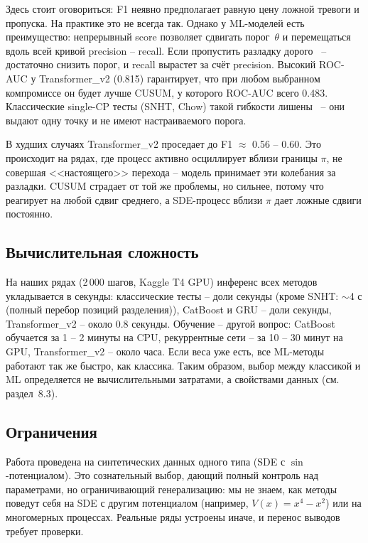 \documentclass[12pt,a4paper]{article}
\begin{document}
Здесь стоит оговориться: F1 неявно предполагает равную цену 
ложной тревоги и пропуска. На практике это не всегда так. 
Однако у ML-моделей есть преимущество: непрерывный score 
позволяет сдвигать порог~$\theta$ и перемещаться вдоль всей 
кривой precision -- recall. Если пропустить разладку дорого~ -- 
достаточно снизить порог, и recall вырастет за счёт precision. 
Высокий ROC-AUC у Transformer\_v2 (0.815) гарантирует, что 
при любом выбранном компромиссе он будет лучше CUSUM, у 
которого ROC-AUC всего 0.483. Классические single-CP тесты 
(SNHT, Chow) такой гибкости лишены~ -- они выдают одну точку 
и не имеют настраиваемого порога.

В худших случаях Transformer\_v2 проседает до F1 $\approx$ 0.56 -- 0.60. Это происходит на рядах, где процесс активно осциллирует вблизи границы $\pi$, не совершая <<настоящего>> перехода  -- модель принимает эти колебания за разладки. CUSUM страдает от той же проблемы, но сильнее, потому что реагирует на любой сдвиг среднего, а SDE-процесс вблизи $\pi$ дает ложные сдвиги постоянно.

\subsection{Вычислительная сложность}

На наших рядах (2\,000 шагов, Kaggle T4 GPU) инференс всех методов укладывается в секунды: классические тесты  -- доли секунды (кроме SNHT: $\sim$4 с (полный перебор позиций разделения)), CatBoost и GRU  -- доли секунды, Transformer\_v2  -- около 0.8 секунды. Обучение  -- другой вопрос: CatBoost обучается за 1 -- 2 минуты на CPU, рекуррентные сети  -- за 10 -- 30 минут на GPU, Transformer\_v2  -- около часа. Если веса уже есть, все ML-методы работают так же быстро, как классика. Таким образом, выбор между классикой и ML определяется не вычислительными затратами, а свойствами данных (см. раздел~8.3).

\subsection{Ограничения}

Работа проведена на синтетических данных одного типа (SDE с $\sin$-потенциалом). Это сознательный выбор, дающий полный контроль над параметрами, но ограничивающий генерализацию: мы не знаем, как методы поведут себя на SDE с другим потенциалом (например, $V(x) = x^4 - x^2$) или на многомерных процессах. Реальные ряды устроены иначе, и перенос выводов требует проверки.
\end{document}
